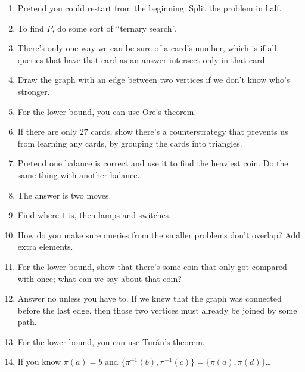 \documentclass[11pt,paper=letter]{scrartcl}
\begin{document}
\begin{enumerate}

\item \label{h:14} Pretend you could restart from the beginning. Split the problem in half.

\item \label{h:7} To find $P$, do some sort of ``ternary search''.

\item \label{h:16} There's only one way we can be sure of a card's number, which is if all queries that have that card as an answer intersect only in that card.

\item \label{h:9} Draw the graph with an edge between two vertices if we don't know who's stronger.

\item \label{h:3} For the lower bound, you can use Ore's theorem.

\item \label{h:18} If there are only $27$ cards, show there's a counterstrategy that prevents us from learning any cards, by grouping the cards into triangles.

\item \label{h:4} Pretend one balance is correct and use it to find the heaviest coin. Do the same thing with another balance.

\item \label{h:12} The answer is two moves.

\item \label{h:1} Find where $1$ is, then lamps-and-switches.

\item \label{h:15} How do you make sure queries from the smaller problems don't overlap? Add extra elements.

\item \label{h:5} For the lower bound, show that there's some coin that only got compared with once; what can we say about that coin?

\item \label{h:11} Answer no unless you have to. If we knew that the graph was connected before the last edge, then those two vertices must already be joined by some path.

\item \label{h:2} For the lower bound, you can use Tur\'an's theorem.

\item \label{h:13} If you know $\pi(a) = b$ and $\{\pi^{-1}(b), \pi^{-1}(c)\} = \{\pi(a), \pi(d)\}$\dots


\end{enumerate}
\end{document}

